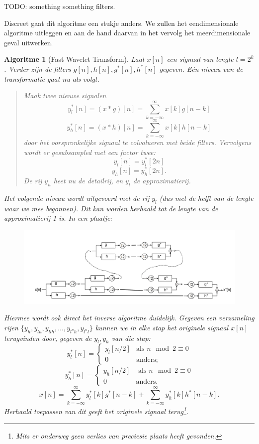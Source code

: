 \documentclass[11pt]{amsart}
\newtheorem*{algoritme}{Algoritme}
\begin{document}
TODO: something something filters.

Discreet gaat dit algoritme een stukje anders. We zullen het eendimensionale algoritme uitleggen en aan de hand daarvan in het vervolg het meerdimensionale geval uitwerken.

\begin{algoritme}[Fast Wavelet Transform]
Laat $x[n]$ een signaal van lengte $l = 2^k$. Verder zijn de filters $g[n], h[n],g^*[n], h^*[n]$ gegeven. E\'en niveau van de transformatie gaat nu als volgt.

\begin{quote}
Maak twee nieuwe signalen 
\[
y_l^*[n] = (x * g)[n] = \sum_{k=-\infty}^\infty x[k]g[n-k]
\]
\[
y_h^*[n] = (x * h)[n] = \sum_{k=-\infty}^\infty x[k]h[n-k]
\]
door het oorspronkelijke signaal te colvolueren met beide filters. Vervolgens wordt er ge\emph{subsampled} met een factor twee:
\[
y_l[n] = y_l^*[2n]
\]
\[
y_h[n] = y_h^*[2n].
\]
De rij $y_h$ heet nu de \emph{detail}rij, en $y_l$ de \emph{approximatie}rij.
\end{quote}
Het volgende niveau wordt uitgevoerd met de rij $y_l$ (dus met de helft van de lengte waar we mee begonnen). Dit kan worden herhaald tot de lengte van de approximatierij 1 is. In een plaatje:
\begin{figure}[h]
\includegraphics{filter_bank_kankerzuur.jpg}
\end{figure}

Hiermee wordt ook direct het inverse algoritme duidelijk. Gegeven een verzameling rijen $\{y_h, y_{lh}, y_{llh}, \ldots, y_{l^nh}, y_{l^nl}\}$ kunnen we in elke stap het originele signaal $x[n]$ terugvinden door, gegeven de $y_l, y_h$ van die stap:
\[
	y^*_{l}[n] = \begin{cases} y_{l}[n/2] &\text{als } n \mod{2} \equiv 0 \\ 0 &\text{anders}; \end{cases}
\]
\[
	y^*_{h}[n] = \begin{cases} y_{h}[n/2] &\text{ als } n \mod{2} \equiv 0 \\ 0 &\text{anders}. \end{cases}
\]
\[
	x[n] = \sum_{k=-\infty}^\infty y^*_{l}[k]g^*[n-k] + \sum_{k=-\infty}^\infty y^*_{h}[k]h^*[n-k].
\]
Herhaald toepassen van dit geeft het originele signaal terug\footnote{Mits er onderweg geen verlies van preciesie plaats heeft gevonden.}.
\end{algoritme}
\end{document}
